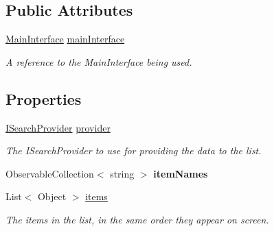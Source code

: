 \subsection*{Public Attributes}
\begin{DoxyCompactItemize}
\item 
\mbox{\hyperlink{class_aim_1_1_database_interface_1_1_windows_1_1_main_interface}{Main\+Interface}} \mbox{\hyperlink{class_aim_1_1_database_interface_1_1_controls_1_1_listbox_selector_editor_control_a409017b59b79b775e0dca74f28adc174}{main\+Interface}}
\begin{DoxyCompactList}\small\item\em A reference to the Main\+Interface being used. \end{DoxyCompactList}\end{DoxyCompactItemize}
\subsection*{Properties}
\begin{DoxyCompactItemize}
\item 
\mbox{\hyperlink{interface_aim_1_1_database_interface_1_1_interfaces_1_1_i_search_provider}{I\+Search\+Provider}} \mbox{\hyperlink{class_aim_1_1_database_interface_1_1_controls_1_1_listbox_selector_editor_control_a8134970f3f55df8df50e1496d4dcc1bb}{provider}}
\begin{DoxyCompactList}\small\item\em The I\+Search\+Provider to use for providing the data to the list. \end{DoxyCompactList}\item 
\mbox{\label{class_aim_1_1_database_interface_1_1_controls_1_1_listbox_selector_editor_control_ab0c786a6e190f22b7103da610f4adf0d}} 
Observable\+Collection$<$ string $>$ {\bfseries item\+Names}
\item 
List$<$ Object $>$ \mbox{\hyperlink{class_aim_1_1_database_interface_1_1_controls_1_1_listbox_selector_editor_control_ad1de3dde9f4b18186482336335f7efc2}{items}}
\begin{DoxyCompactList}\small\item\em The items in the list, in the same order they appear on screen. \end{DoxyCompactList}\end{DoxyCompactItemize}
